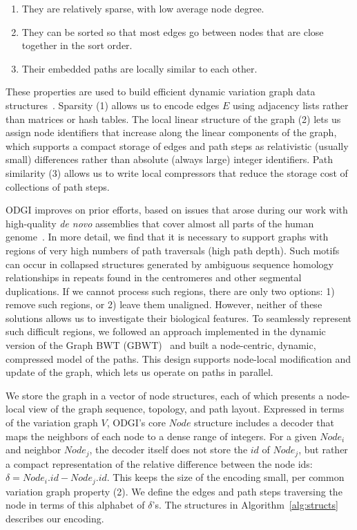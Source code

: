 \documentclass{bioinfo}
\newcommand{\red}[1]{{\textcolor{Red}{#1}}}
\newcommand{\FIXME}[1]{\red{[FIXME: #1]}}
\begin{document}
\begin{enumerate}
\item They are relatively sparse, with low average node degree.
\item They can be sorted so that most edges go between nodes that are close together in the sort order.
\item Their embedded paths are locally similar to each other.
\end{enumerate}

These properties are used to build efficient dynamic variation graph data structures~\citep{Siren:2020,Eizenga_2020_BX}.
Sparsity (1) allows us to encode edges $E$ using adjacency lists rather than matrices or hash tables.
The local linear structure of the graph (2) lets us assign node identifiers that increase along the linear components of the graph, which supports a compact storage of edges and path steps as relativistic (usually small) differences rather than absolute (always large) integer identifiers.
Path similarity (3) allows us to write local compressors that reduce the storage cost of collections of path steps.

ODGI improves on prior efforts, based on issues that arose during our work with high-quality \textit{de novo} assemblies that cover almost all parts of the human genome~\citep{Logsdon_2021,Nurk_2021}.
In more detail, we find that it is necessary to support graphs with regions of very high numbers of path traversals (high path depth).
Such motifs can occur in collapsed structures generated by ambiguous sequence homology relationships in repeats found in the centromeres and other segmental duplications.
If we cannot process such regions, there are only two options: 1) remove such regions, or 2) leave them unaligned.
However, neither of these solutions allows us to investigate their biological features.
To seamlessly represent such difficult regions, we followed an approach implemented in the dynamic version of the Graph BWT (GBWT)~\citep{Siren:2020} and built a node-centric, dynamic, compressed model of the paths.
This design supports node-local modification and update of the graph, which lets us operate on paths in parallel.

We store the graph in a vector of node structures, each of which presents a node-local view of the graph sequence, topology, and path layout.
Expressed in terms of the variation graph $V$, ODGI's core $Node$ structure includes a decoder that maps the neighbors of each node to a dense range of integers.
For a given $Node_i$ and neighbor $Node_j$, the decoder itself does not store the $id$ of $Node_j$, but rather a compact representation of the relative difference between the node ids: $\delta = Node_i.id - Node_j.id$.
This keeps the size of the encoding small, per common variation graph property (2).
We define the edges and path steps traversing the node in terms of this alphabet of $\delta$'s.
The structures in Algorithm~\ref{alg:structs} describes our encoding.
\end{document}
